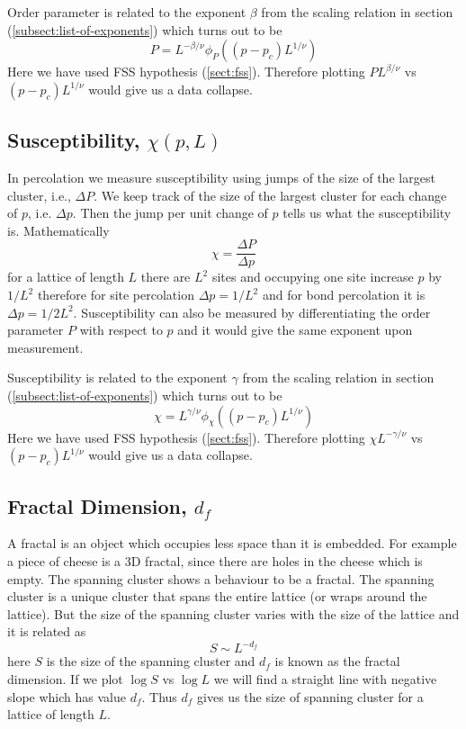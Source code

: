 		Order parameter is related to the exponent $\beta$		from the scaling relation in section (\ref{subsect:list-of-exponents}) which turns out to be
		\begin{equation}
		P = L^{-\beta/\nu} \phi_P(\left(p-p_c\right)L^{1/\nu})
		\end{equation}
		Here we have used FSS hypothesis (\ref{sect:fss}).
		Therefore plotting $P L^{\beta/\nu}$ vs $\left(p-p_c\right)L^{1/\nu}$ would give us a data collapse.
			 
			 
	\subsection{Susceptibility, $\chi(p,L)$}
		In percolation we measure susceptibility using jumps of the size of the largest cluster, i.e., $\Delta P$. We keep track of the size of the largest cluster for each change of $p$, i.e. $\Delta p$. Then the jump per unit change of $p$ tells us what the susceptibility is. Mathematically
		\begin{equation}
			\chi = \frac{\Delta P}{\Delta p}
		\end{equation}
		for a lattice of length $L$ there are $L^2$ sites and occupying one site increase $p$ by $1/L^2$ therefore for site percolation $\Delta p = 1 /L^2$ and for bond percolation it is $\Delta p = 1 / 2 L^2$.		Susceptibility can also be measured by differentiating the order parameter $P$ with respect to $p$ and it would give the same exponent upon measurement.
		
		
		Susceptibility is related to the exponent $\gamma$		from the scaling relation in section (\ref{subsect:list-of-exponents}) which turns out to be
		\begin{equation}
		\chi = L^{\gamma/\nu} \phi_\chi(\left(p-p_c\right)L^{1/\nu})
		\end{equation}
		Here we have used FSS hypothesis (\ref{sect:fss}).
		 Therefore plotting $\chi L^{-\gamma/\nu}$ vs $\left(p-p_c\right)L^{1/\nu}$ would give us a data collapse.
		 

	\subsection{Fractal Dimension, $d_f$} 
		\label{subsect:fractal-dim}
		 A fractal \cite{Falconer2003} is an object which occupies less space than it is embedded. For example a piece of cheese is a 3D fractal, since there are holes in the cheese which is empty. The spanning cluster shows a behaviour to be a fractal.		The spanning cluster is a unique cluster that spans the entire lattice (or wraps around the lattice). But the size of the spanning cluster varies with the size of the lattice and it is related as
		\begin{equation}
			S \sim L^{-d_f}
		\end{equation}
		here $S$ is the size of the spanning cluster and $d_f$ is known as the fractal dimension. If we plot $\log S$ vs $\log L$ we will find a straight line with negative slope which has value $d_f$. Thus $d_f$ gives us the size of spanning cluster for a lattice of length $L$.
	
